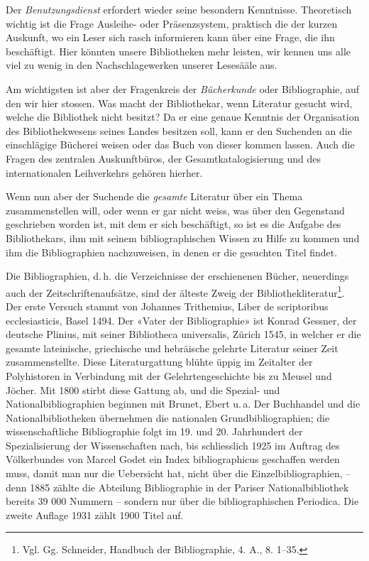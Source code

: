\documentclass[a4paper,
fontsize=11pt,
oneside,
numbers=noperiodatend,
parskip=half-,
bibliography=totoc,
final
]{scrartcl}
\begin{document}
Der \emph{Benutzungsdienst} erfordert wieder seine besondern Kenntnisse.
Theoretisch wichtig ist die Frage Ausleihe- oder Präsenzsystem,
praktisch die der kurzen Auskunft, wo ein Leser sich rasch informieren
kann über eine Frage, die ihn beschäftigt. Hier könnten unsere
Bibliotheken mehr leisten, wir kennen uns alle viel zu wenig in den
Nachschlagewerken unserer Lesesääle aus.

Am wichtigsten ist aber der Fragenkreis der \emph{Bücherkunde} oder
Bibliographie, auf den wir hier stossen. Was macht der Bibliothekar,
wenn Literatur gesucht wird, welche die Bibliothek nicht besitzt? Da er
eine genaue Kenntnis der Organisation des Bibliothekwesens seines Landes
besitzen soll, kann er den Suchenden an die einschlägige Bücherei weisen
oder das Buch von dieser kommen lassen. Auch die Fragen des zentralen
Auskunftbüros, der Gesamtkatalogisierung und des internationalen
Leihverkehrs gehören hierher.

Wenn nun aber der Suchende die \emph{gesamte} Literatur über ein Thema
zusammenstellen will, oder wenn er gar nicht weiss, was über den
Gegenstand geschrieben worden ist, mit dem er sich beschäftigt, so ist
es die Aufgabe des Bibliothekars, ihm mit seinem bibliographischen
Wissen zu Hilfe zu kommen und ihm die Bibliographien nachzuweisen, in
denen er die gesuchten Titel findet.

Die Bibliographien, d.\,h. die Verzeichnisse der erschienenen Bücher,
neuerdings auch der Zeitschriftenaufsätze, sind der älteste Zweig der
Bibliothekliteratur\footnote{Vgl. Gg. Schneider, Handbuch der
  Bibliographie, 4. A., 8. 1--35.}. Der erste Versuch stammt von
Johannes Trithemius, Liber de scriptoribus ecclesiasticis, Basel 1494.
Der «Vater der Bibliographie» ist Konrad Gessner, der deutsche Plinius,
mit seiner Bibliotheca universalis, Zürich 1545, in welcher er die
gesamte lateinische, griechische und hebräische gelehrte Literatur
seiner Zeit zusammenstellte. Diese Literaturgattung blühte üppig im
Zeitalter der Polyhistoren in Verbindung mit der Gelehrtengeschichte bis
zu Meusel und Jöcher. Mit 1800 stirbt diese Gattung ab, und die Spezial-
und Nationalbibliographien beginnen mit Brunet, Ebert u.\,a. Der
Buchhandel und die Nationalbibliotheken übernehmen die nationalen
Grundbibliographien; die wissenschaftliche Bibliographie folgt im 19.
und 20. Jahrhundert der Spezialisierung der Wissenschaften nach, bis
schliesslich 1925 im Auftrag des Völkerbundes von Marcel Godet ein Index
bibliographicus geschaffen werden muss, damit man nur die Uebersicht
hat, nicht über die Einzelbibliographien, -- denn 1885 zählte die
Abteilung Bibliographie in der Pariser Nationalbibliothek bereits 39 000
Nummern -- sondern nur über die bibliographischen Periodica. Die zweite
Auflage 1931 zählt 1900 Titel auf.
\end{document}
